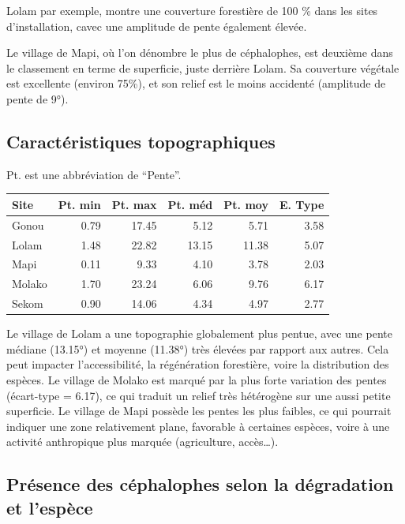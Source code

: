 \documentclass[
]{book}
\begin{document}
Lolam par exemple, montre une couverture forestière de 100 \% dans les sites d'installation, cavec une amplitude de pente également élevée.

Le village de Mapi, où l'on dénombre le plus de céphalophes, est deuxième dans le classement en terme de superficie, juste derrière Lolam. Sa couverture végétale est excellente (environ 75\%), et son relief est le moins accidenté (amplitude de pente de 9°).

\subsection{Caractéristiques topographiques}\label{caractuxe9ristiques-topographiques}

Pt. est une abbréviation de ``Pente''.

\begin{tabular}{l|r|r|r|r|r}
\hline
Site & Pt. min & Pt. max & Pt. méd & Pt. moy & E. Type\\
\hline
Gonou & 0.79 & 17.45 & 5.12 & 5.71 & 3.58\\
\hline
Lolam & 1.48 & 22.82 & 13.15 & 11.38 & 5.07\\
\hline
Mapi & 0.11 & 9.33 & 4.10 & 3.78 & 2.03\\
\hline
Molako & 1.70 & 23.24 & 6.06 & 9.76 & 6.17\\
\hline
Sekom & 0.90 & 14.06 & 4.34 & 4.97 & 2.77\\
\hline
\end{tabular}

Le village de Lolam a une topographie globalement plus pentue, avec une pente médiane (13.15°) et moyenne (11.38°) très élevées par rapport aux autres. Cela peut impacter l'accessibilité, la régénération forestière, voire la distribution des espèces. Le village de Molako est marqué par la plus forte variation des pentes (écart-type = 6.17), ce qui traduit un relief très hétérogène sur une aussi petite superficie. Le village de Mapi possède les pentes les plus faibles, ce qui pourrait indiquer une zone relativement plane, favorable à certaines espèces, voire à une activité anthropique plus marquée (agriculture, accès\ldots).

\subsection{Présence des céphalophes selon la dégradation et l'espèce}\label{pruxe9sence-des-cuxe9phalophes-selon-la-duxe9gradation-et-lespuxe8ce}
\end{document}
